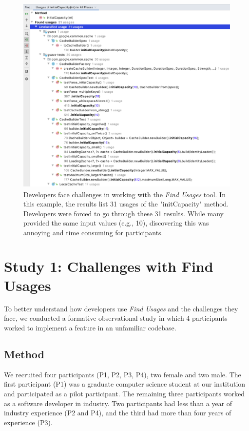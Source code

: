 \documentclass[conference]{IEEEtran}
\begin{document}
\begin{figure}[h]
    \centering
    \includegraphics [width=15cm,height=10cm,keepaspectratio,clip]{figures/challenge}
    \caption{Developers face challenges in working with the \textit{Find Usages} tool. In this example, the results list 31 usages of the "initCapacity" method. Developers were forced to go through these 31 results. 
    While many provided the same input values (e.g., 10), discovering this was annoying and time consuming for participants. 
}
\label{fig:usege}
\end{figure}
\section{Study 1: Challenges with Find Usages}

To better understand how developers use \textit{Find Usages} and the challenges they face, we conducted a formative observational study in which 4 participants worked to implement a feature in an unfamiliar codebase.

\subsection{Method}
We recruited four participants (P1, P2, P3, P4), two female and two male. The first participant (P1) was a graduate computer science student at our institution and participated as a pilot participant. The remaining three participants worked as a software developer in industry. Two participants had less than a year of industry experience (P2 and P4), and the third had more than four years of experience (P3).\par 
\end{document}
